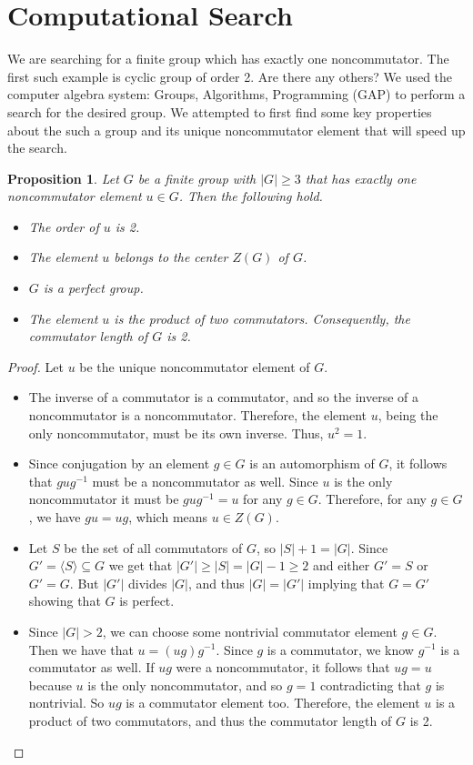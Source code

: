 \documentclass[11pt,twoside]{amsart}
\newtheorem{prop}[thm]{Proposition}
\numberwithin{equation}{section}
\begin{document}
\section{Computational Search}
We are searching for a finite group which has exactly one noncommutator. The first such example is cyclic group of order 2. Are there any others? We used the computer algebra system: Groups, Algorithms, Programming (GAP) to perform a search for the desired group. We attempted to first find some key properties about the such a group and its unique noncommutator element that will speed up the search.
\begin{prop}
Let $G$ be a finite group with $|G|\geq 3$ that has exactly one noncommutator element $u\in G$. Then the following hold.  
\begin{itemize}
            \item The order of $u$ is 2.
            \item The element $u$ belongs to the center $Z(G)$ of $G$.
            \item $G$ is a perfect group.
            \item The element $u$ is the product of two commutators. Consequently, the commutator length of $G$ is 2.
\end{itemize}
\label{four_props}
\end{prop}
\begin{proof} Let $u$ be the unique noncommutator element of $G$.
\begin{itemize}
    \item The inverse of a commutator is a commutator, and so the inverse of a noncommutator is a noncommutator. Therefore, the element $u$, being the only noncommutator, must be its own inverse. Thus, $u^2 = 1$.
    \item Since conjugation by an element $g\in G$ is an automorphism of $G$, it follows that $gug^{-1}$ must be a noncommutator as well. Since $u$ is the only noncommutator it must be $gug^{-1}=u$ for any $g\in G$.  Therefore, for any $g\in G$, we have $gu=ug$, which means $u \in Z(G)$.
    \item Let $S$ be the set of all commutators of $G$, so $|S|+1=|G|$. Since $G'=\langle S \rangle\subseteq G$ we get that $|G'|\geq |S| = |G|-1\geq 2$ and either $G'=S$ or $G'=G$. But $|G'|$ divides $|G|$, and thus $|G|=|G'|$ implying that $G=G'$ showing that $G$ is perfect.
    \item Since $|G| > 2$, we can choose some nontrivial commutator element $g\in G$. Then we have that $u=(ug)g^{-1}$. Since $g$ is a commutator, we know $g^{-1}$ is a  commutator as well. If $ug$ were a noncommutator, it follows that $ug=u$ because $u$ is the only noncommutator, and so $g=1$ contradicting that $g$ is nontrivial. So $ug$ is a commutator element too. Therefore, the element $u$ is a product of two commutators, and thus the commutator length of $G$ is 2.
\end{itemize}
\end{proof}
\end{document}
